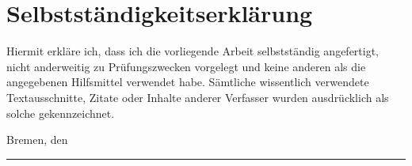 \section*{Selbstständigkeitserklärung}

Hiermit erkläre ich, dass ich die vorliegende Arbeit selbstständig angefertigt,
nicht anderweitig zu Prüfungszwecken vorgelegt und keine anderen als die
angegebenen Hilfsmittel verwendet habe. Sämtliche wissentlich verwendete
Textausschnitte, Zitate oder Inhalte anderer Verfasser wurden ausdrücklich als
solche gekennzeichnet.

Bremen, den \makeatletter\@date\makeatother

\vspace*{1em}
\rule{15em}{0.16667pt}\\
\makeatletter\@author\makeatother
